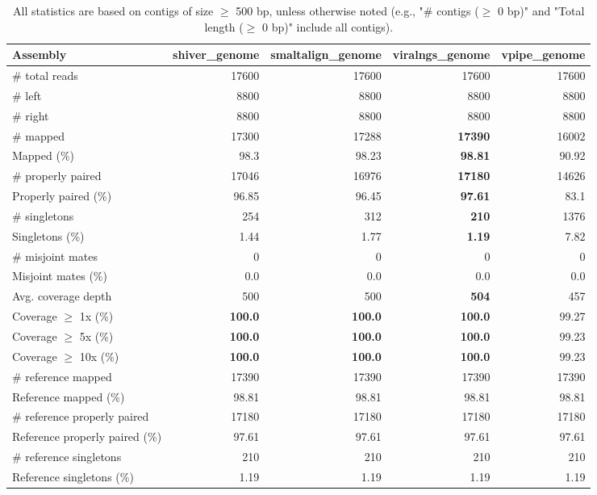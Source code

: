 \documentclass[12pt,a4paper]{article}
\begin{document}
\begin{table}[ht]
\begin{center}
\caption{All statistics are based on contigs of size $\geq$ 500 bp, unless otherwise noted (e.g., "\# contigs ($\geq$ 0 bp)" and "Total length ($\geq$ 0 bp)" include all contigs).}
\begin{tabular}{|l*{4}{|r}|}
\hline
Assembly & shiver\_genome & smaltalign\_genome & viralngs\_genome & vpipe\_genome \\ \hline
\# total reads & 17600 & 17600 & 17600 & 17600 \\ \hline
\# left & 8800 & 8800 & 8800 & 8800 \\ \hline
\# right & 8800 & 8800 & 8800 & 8800 \\ \hline
\# mapped & 17300 & 17288 & {\bf 17390} & 16002 \\ \hline
Mapped (\%) & 98.3 & 98.23 & {\bf 98.81} & 90.92 \\ \hline
\# properly paired & 17046 & 16976 & {\bf 17180} & 14626 \\ \hline
Properly paired (\%) & 96.85 & 96.45 & {\bf 97.61} & 83.1 \\ \hline
\# singletons & 254 & 312 & {\bf 210} & 1376 \\ \hline
Singletons (\%) & 1.44 & 1.77 & {\bf 1.19} & 7.82 \\ \hline
\# misjoint mates & 0 & 0 & 0 & 0 \\ \hline
Misjoint mates (\%) & 0.0 & 0.0 & 0.0 & 0.0 \\ \hline
Avg. coverage depth & 500 & 500 & {\bf 504} & 457 \\ \hline
Coverage $\geq$ 1x (\%) & {\bf 100.0} & {\bf 100.0} & {\bf 100.0} & 99.27 \\ \hline
Coverage $\geq$ 5x (\%) & {\bf 100.0} & {\bf 100.0} & {\bf 100.0} & 99.23 \\ \hline
Coverage $\geq$ 10x (\%) & {\bf 100.0} & {\bf 100.0} & {\bf 100.0} & 99.23 \\ \hline
\# reference mapped & 17390 & 17390 & 17390 & 17390 \\ \hline
Reference mapped (\%) & 98.81 & 98.81 & 98.81 & 98.81 \\ \hline
\# reference properly paired & 17180 & 17180 & 17180 & 17180 \\ \hline
Reference properly paired (\%) & 97.61 & 97.61 & 97.61 & 97.61 \\ \hline
\# reference singletons & 210 & 210 & 210 & 210 \\ \hline
Reference singletons (\%) & 1.19 & 1.19 & 1.19 & 1.19 \\ \hline

\end{tabular}
\end{center}
\end{table}
\end{document}
